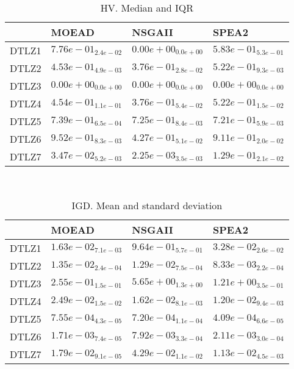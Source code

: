\documentclass{article}
\begin{document}
\begin{table}
\caption{HV. Median and IQR}
\label{table:median.HV}
\begin{scriptsize}
\centering
\begin{tabular}{llll}
\hline & MOEAD & NSGAII &  SPEA2\\
\hline
DTLZ1 & \cellcolor{gray95}$  7.76e-01_{ 2.4e-02}$ & $  0.00e+00_{ 0.0e+00}$ & $  5.83e-01_{ 5.3e-01}$ \\
DTLZ2 & \cellcolor{gray25}$  4.53e-01_{ 4.9e-03}$ & $  3.76e-01_{ 2.8e-02}$ & \cellcolor{gray95}$  5.22e-01_{ 9.3e-03}$ \\
DTLZ3 & $  0.00e+00_{ 0.0e+00}$ & $  0.00e+00_{ 0.0e+00}$ & $  0.00e+00_{ 0.0e+00}$ \\
DTLZ4 & \cellcolor{gray25}$  4.54e-01_{ 1.1e-01}$ & $  3.76e-01_{ 5.4e-02}$ & \cellcolor{gray95}$  5.22e-01_{ 1.5e-02}$ \\
DTLZ5 & \cellcolor{gray95}$  7.39e-01_{ 6.5e-04}$ & \cellcolor{gray25}$  7.25e-01_{ 8.4e-03}$ & $  7.21e-01_{ 5.9e-03}$ \\
DTLZ6 & \cellcolor{gray95}$  9.52e-01_{ 8.3e-03}$ & $  4.27e-01_{ 5.1e-02}$ & $  9.11e-01_{ 2.0e-02}$ \\
DTLZ7 & \cellcolor{gray25}$  3.47e-02_{ 5.2e-03}$ & $  2.25e-03_{ 3.5e-03}$ & \cellcolor{gray95}$  1.29e-01_{ 2.1e-02}$ \\
\hline
\end{tabular}
\end{scriptsize}
\end{table}
\
\begin{table}
\caption{IGD. Mean and standard deviation}
\label{table:mean.IGD}
\centering
\begin{scriptsize}
\begin{tabular}{llll}
\hline & MOEAD & NSGAII &  SPEA2\\
\hline
DTLZ1 & \cellcolor{gray95}$  1.63e-02_{ 7.1e-03}$ & $  9.64e-01_{ 5.7e-01}$ & $  3.28e-02_{ 2.6e-02}$ \\
DTLZ2 & $  1.35e-02_{ 2.4e-04}$ & \cellcolor{gray25}$  1.29e-02_{ 7.5e-04}$ & \cellcolor{gray95}$  8.33e-03_{ 2.2e-04}$ \\
DTLZ3 & \cellcolor{gray95}$  2.55e-01_{ 1.5e-01}$ & $  5.65e+00_{ 1.3e+00}$ & $  1.21e+00_{ 3.5e-01}$ \\
DTLZ4 & $  2.49e-02_{ 1.5e-02}$ & \cellcolor{gray25}$  1.62e-02_{ 8.1e-03}$ & \cellcolor{gray95}$  1.20e-02_{ 9.4e-03}$ \\
DTLZ5 & $  7.55e-04_{ 4.3e-05}$ & \cellcolor{gray25}$  7.20e-04_{ 1.1e-04}$ & \cellcolor{gray95}$  4.09e-04_{ 6.6e-05}$ \\
DTLZ6 & \cellcolor{gray95}$  1.71e-03_{ 7.4e-05}$ & $  7.92e-03_{ 3.3e-04}$ & $  2.11e-03_{ 3.0e-04}$ \\
DTLZ7 & \cellcolor{gray25}$  1.79e-02_{ 9.1e-05}$ & $  4.29e-02_{ 1.1e-02}$ & \cellcolor{gray95}$  1.13e-02_{ 4.5e-03}$ \\
\hline
\end{tabular}
\end{scriptsize}
\end{table}
\end{document}
